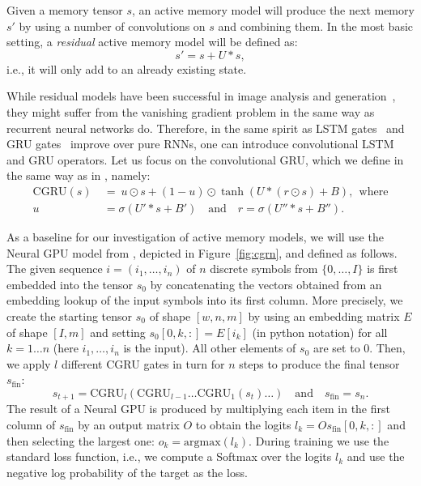 \documentclass{article}
\newcommand\sigmoid{\sigma}
\newcommand\argmax{\mathrm{argmax}}
\newcommand\cgru{\ensuremath{\mathrm{CGRU}}}
\newcommand\sfin{s_\mathrm{fin}}
\begin{document}
Given a memory tensor $s$, an active memory model will produce the next
memory $s'$ by using a number of convolutions on $s$ and combining them.
In the most basic setting, a \emph{residual} active memory model
will be defined as:
\[ s' = s + U * s, \]
i.e., it will only add to an already existing state.

While residual models have been successful in image analysis \cite{resnet} and
generation~\cite{one_shot}, they might suffer from the vanishing gradient problem
in the same way as recurrent neural networks do. Therefore, in the same spirit
as LSTM gates~\cite{hochreiter1997} and GRU gates~\cite{gru2014} improve
over pure RNNs, one can introduce convolutional LSTM and GRU operators.
Let us focus on the convolutional GRU, which we define in the same
way as in \cite{neural_gpu}, namely:
\begin{equation} \label{eq:cgru}
\begin{split}
 \cgru(s) \ &= \ u \odot s + (1 - u) \odot \tanh(U * (r \odot s) + B),
     \ \ \textrm{where} \\
 u &= \sigmoid(U' * s + B')\quad \mathrm{and}\quad r = \sigmoid(U''*s + B'').
\end{split}
\end{equation}

As a baseline for our investigation of active memory models,
we will use the Neural GPU model from \cite{neural_gpu},
depicted in Figure~\ref{fig:cgrn}, and defined as follows.
The given sequence $i = (i_1,\ldots,i_n)$ of $n$ discrete symbols
from $\{0,\dots,I\}$ is first embedded
into the tensor $s_0$ by concatenating the vectors obtained from
an embedding lookup of the input symbols into its first column.
More precisely, we create the starting tensor $s_0$ of shape
$[w,n,m]$ by using an embedding matrix $E$ of shape $[I, m]$
and setting $s_0[0,k,:] = E[i_k]$ (in python notation)
for all $k=1 \dots n$  (here $i_1,\ldots,i_n$ is the input).
All other elements of $s_0$ are set to $0$.
Then, we apply $l$ different CGRU gates
in turn for $n$ steps to produce the final tensor $\sfin$:
\[ s_{t+1} = \cgru_l(\cgru_{l-1} \dots \cgru_1(s_t) \dots ) \quad
     \mathrm{and} \quad \sfin = s_n. \]
The result of a Neural GPU is produced by multiplying each item in
the first column of $\sfin$ by an output matrix $O$ to obtain the logits
$l_k = O \sfin[0,k,:]$ and then selecting the largest one:
$o_k = \argmax(l_k)$. During training we use the standard loss function,
i.e., we compute a Softmax over the logits $l_k$ and use
the negative log probability of the target as the loss.
\end{document}
